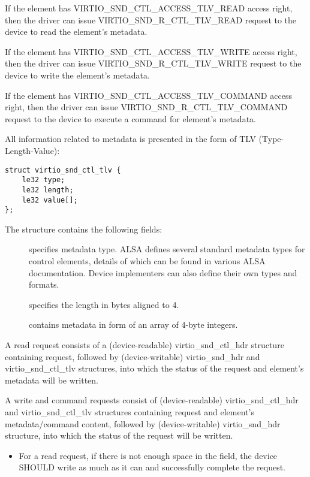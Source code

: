 If the element has VIRTIO_SND_CTL_ACCESS_TLV_READ access right, then the driver
can issue VIRTIO_SND_R_CTL_TLV_READ request to the device to read the element's
metadata.

If the element has VIRTIO_SND_CTL_ACCESS_TLV_WRITE access right, then the driver
can issue VIRTIO_SND_R_CTL_TLV_WRITE request to the device to write the element's
metadata.

If the element has VIRTIO_SND_CTL_ACCESS_TLV_COMMAND access right, then the driver
can issue VIRTIO_SND_R_CTL_TLV_COMMAND request to the device to execute a command
for element's metadata.

All information related to metadata is presented in the form of TLV (Type-Length-Value):

\begin{lstlisting}
struct virtio_snd_ctl_tlv {
    le32 type;
    le32 length;
    le32 value[];
};
\end{lstlisting}

The structure contains the following fields:

\begin{description}
\item[] specifies metadata type. ALSA defines several standard metadata
types for control elements, details of which can be found in various ALSA documentation.
Device implementers can also define their own types and formats.
\item[] specifies the  length in bytes aligned to 4.
\item[] contains metadata in form of an array of 4-byte integers.
\end{description}

A read request consists of a (device-readable) virtio_snd_ctl_hdr structure
containing request, followed by (device-writable) virtio_snd_hdr and
virtio_snd_ctl_tlv structures, into which the status of the request and
element's metadata will be written.

A write and command requests consist of (device-readable) virtio_snd_ctl_hdr and
virtio_snd_ctl_tlv structures containing request and element's metadata/command
content, followed by (device-writable) virtio_snd_hdr structure, into which the
status of the request will be written.


\begin{itemize}
\item For a read request, if there is not enough space in the  field,
the device SHOULD write as much as it can and successfully complete the request.
\end{itemize}

